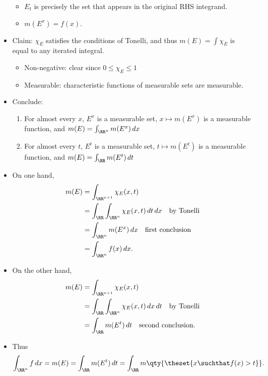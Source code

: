 \begin{solution}
\begin{itemize}
  \begin{itemize}
  \tightlist
  \item
    \(E_t\) is precisely the set that appears in the original RHS
    integrand.
  \item
    \(m(E^x) = f(x)\).
  \end{itemize}
\item
  Claim: \(\chi_E\) satisfies the conditions of Tonelli, and thus
  \(m(E) = \int \chi_E\) is equal to any iterated integral.

  \begin{itemize}
  \tightlist
  \item
    Non-negative: clear since \(0\leq \chi_E \leq 1\)
  \item
    Measurable: characteristic functions of measurable sets are
    measurable.
  \end{itemize}
\item
  Conclude:

  \begin{enumerate}
  \def\labelenumi{\arabic{enumi}.}
  \tightlist
  \item
    For almost every \(x\), \(E^x\) is a measurable set,
    \(x\mapsto m(E^x)\) is a measurable function, and
    \(m(E) = \int_{\RR^n} m(E^x) \, dx\)
  \item
    For almost every \(t\), \(E^t\) is a measurable set,
    \(t\mapsto m(E^t)\) is a measurable function, and
    \(m(E) = \int_{\RR} m(E^t) \, dt\)
  \end{enumerate}
\item
  On one hand, \begin{align*}
  m(E) 
  &= \int_{\RR^{n+1}} \chi_E(x, t) \\
  &= \int_{\RR} \int_{\RR^n} \chi_E(x, t) \,dt \,dx \quad\text{by Tonelli}\\
  &= \int_{\RR^n} m(E^x) \,dx \quad\text{first conclusion}\\
  &= \int_{\RR^n} f(x) \,dx 
  .\end{align*}
\item
  On the other hand, \begin{align*}
  m(E) 
  &= \int_{\RR^{n+1}} \chi_E(x, t) \\
  &= \int_\RR \int_{\RR^n} \chi_E(x, t) \, dx \,dt \quad\text{by Tonelli} \\
  &= \int_\RR m(E^t) \,dt \quad\text{second conclusion}
  .\end{align*}
\item
  Thus \begin{align*}
  \int_{\RR^n} f \,dx = m(E) = \int_\RR m(E^t) \,dt = \int_\RR m\qty{\theset{x\suchthat f(x) > t}}
  .\end{align*}
\end{itemize}

\end{solution}

